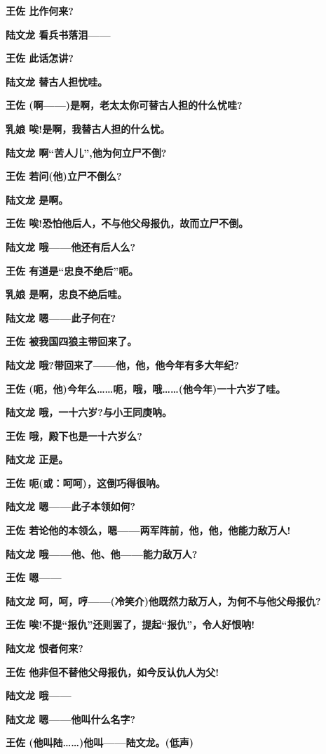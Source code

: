 \textbf{王佐 比作何来?}

\textbf{陆文龙 看兵书落泪------}

\textbf{王佐 此话怎讲?}

\textbf{陆文龙 替古人担忧哇。}

\textbf{王佐 (啊------)是啊，老太太你可替古人担的什么忧哇?}

\textbf{乳娘 唉!是啊，我替古人担的什么忧。}

\textbf{陆文龙 啊``苦人儿'',他为何立尸不倒?}

\textbf{王佐 若问(他)立尸不倒么?}

\textbf{陆文龙 是啊。}

\textbf{王佐 唉!恐怕他后人，不与他父母报仇，故而立尸不倒。}

\textbf{陆文龙 哦------他还有后人么?}

\textbf{王佐 有道是``忠良不绝后''呃。}

\textbf{乳娘 是啊，忠良不绝后哇。}

\textbf{陆文龙 嗯------此子何在?}

\textbf{王佐 被我国四狼主带回来了。}

\textbf{陆文龙 哦?带回来了------他，他，他今年有多大年纪?}

\textbf{王佐
(呃，他)今年么\ldots{}\ldots{}呃，哦，哦\ldots{}\ldots{}(他今年)一十六岁了哇。}

\textbf{陆文龙 哦，一十六岁?与小王同庚呐。}

\textbf{王佐 哦，殿下也是一十六岁么?}

\textbf{陆文龙 正是。}

\textbf{王佐 呃(或：呵呵)，这倒巧得很呐。}

\textbf{陆文龙 嗯------此子本领如何?}

\textbf{王佐 若论他的本领么，嗯------两军阵前，他，他，他能力敌万人!}

\textbf{陆文龙 哦------他、他、他------能力敌万人?}

\textbf{王佐 嗯------}

\textbf{陆文龙
呵，呵，哼------(冷笑介)他既然力敌万人，为何不与他父母报仇?}

\textbf{王佐 唉!不提``报仇''还则罢了，提起``报仇''，令人好恨呐!}

\textbf{陆文龙 恨者何来?}

\textbf{王佐 他非但不替他父母报仇，如今反认仇人为父!}

\textbf{陆文龙 哦------}

\textbf{陆文龙 嗯------他叫什么名字?}

\textbf{王佐 (他叫陆\ldots{}\ldots{})他叫------陆文龙。(低声)}

